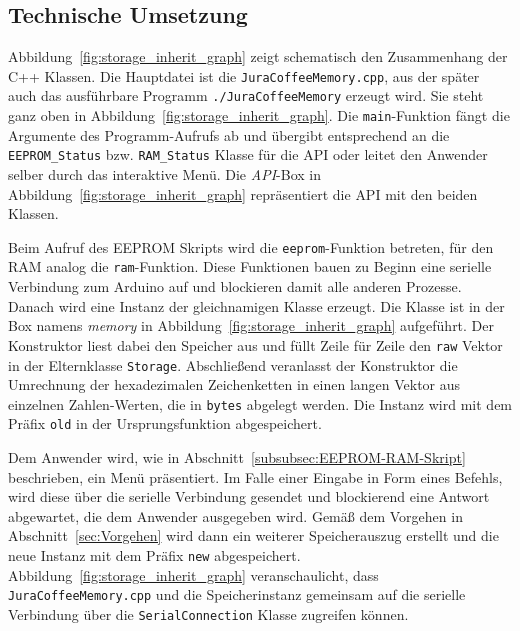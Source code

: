 \subsection{Technische Umsetzung}
Abbildung~\ref{fig:storage_inherit_graph} zeigt schematisch den Zusammenhang der C++ Klassen.
Die Hauptdatei ist die \texttt{JuraCoffeeMemory.cpp}, aus der später auch das ausführbare Programm \texttt{./JuraCoffeeMemory} erzeugt wird.
Sie steht ganz oben in Abbildung~\ref{fig:storage_inherit_graph}.
Die \texttt{main}-Funktion fängt die Argumente des Programm-Aufrufs ab und übergibt entsprechend an die \texttt{EEPROM\_Status} bzw. \texttt{RAM\_Status} Klasse für die \ac{API} oder leitet den Anwender selber durch das interaktive Menü.
Die \textit{API}-Box in Abbildung~\ref{fig:storage_inherit_graph} repräsentiert die \ac{API} mit den beiden Klassen.

Beim Aufruf des \ac{EEPROM} Skripts wird die \texttt{eeprom}-Funktion betreten, für den \ac{RAM} analog die \texttt{ram}-Funktion.
Diese Funktionen bauen zu Beginn eine serielle Verbindung zum Arduino auf und blockieren damit alle anderen Prozesse.
Danach wird eine Instanz der gleichnamigen Klasse erzeugt.
Die Klasse ist in der Box namens \textit{memory} in Abbildung~\ref{fig:storage_inherit_graph} aufgeführt.
Der Konstruktor liest dabei den Speicher aus und füllt Zeile für Zeile den \texttt{raw} Vektor in der Elternklasse \texttt{Storage}.
Abschließend veranlasst der Konstruktor die Umrechnung der hexadezimalen Zeichenketten in einen langen Vektor aus einzelnen Zahlen-Werten, die in \texttt{bytes} abgelegt werden.
Die Instanz wird mit dem Präfix \texttt{old} in der Ursprungsfunktion abgespeichert.

Dem Anwender wird, wie in Abschnitt~\ref{subsubsec:EEPROM-RAM-Skript} beschrieben, ein Menü präsentiert.
Im Falle einer Eingabe in Form eines Befehls, wird diese über die serielle Verbindung gesendet und blockierend eine Antwort abgewartet, die dem Anwender ausgegeben wird.
Gemäß dem Vorgehen in Abschnitt~\ref{sec:Vorgehen} wird dann ein weiterer Speicherauszug erstellt und die neue Instanz mit dem Präfix \texttt{new} abgespeichert.
Abbildung~\ref{fig:storage_inherit_graph} veranschaulicht, dass \texttt{JuraCoffeeMemory.cpp} und die Speicherinstanz gemeinsam auf die serielle Verbindung über die \texttt{SerialConnection} Klasse zugreifen können.

